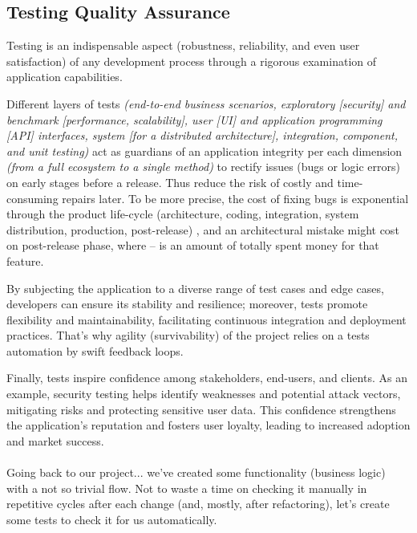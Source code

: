 
\subsection{Testing Quality Assurance}

Testing is an indispensable aspect (robustness, reliability, and even user satisfaction) of any development process 
through a rigorous examination of application capabilities.

Different layers of tests \emph{(end-to-end business scenarios, exploratory [security] and benchmark [performance, scalability], 
user [UI] and application programming [API] interfaces, system [for a distributed architecture], integration, component,
and unit testing)} act as guardians of an application integrity per each dimension \emph{(from a full ecosystem to a 
single method)} to rectify issues (bugs or logic errors) on early stages before a release. Thus reduce the risk of 
costly and time-consuming repairs later. To be more precise, the cost of fixing bugs is exponential through the
product life-cycle (architecture, coding, integration, system distribution, production, post-release) 
\cite{Sanket19}, and an architectural mistake might cost  on post-release phase, where  -- is an amount 
of totally spent money for that feature.

By subjecting the application to a diverse range of test cases and edge cases, developers can ensure its stability and 
resilience; moreover, tests promote flexibility and maintainability, facilitating continuous integration and deployment 
practices. That's why agility (survivability) of the project relies on a tests automation by swift feedback loops.

Finally, tests inspire confidence among stakeholders, end-users, and clients. As an example, security testing helps 
identify weaknesses and potential attack vectors, mitigating risks and protecting sensitive user data. This confidence 
strengthens the application's reputation and fosters user loyalty, leading to increased adoption and market success.\\
\\

\noindent Going back to our project... we've created some functionality (business logic) with a not so trivial flow. 
Not to waste a time on checking it manually in repetitive cycles after each change (and, mostly, after 
refactoring), let's create some tests to check it for us automatically.



